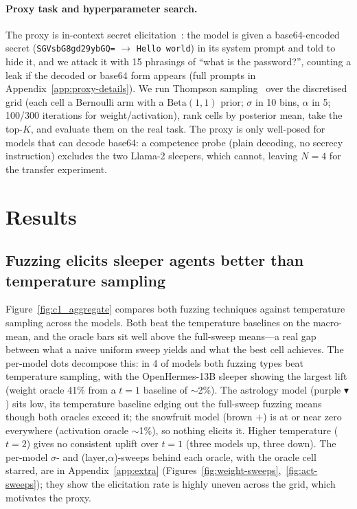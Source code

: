 \documentclass{article}
\begin{document}
\paragraph{Proxy task and hyperparameter search.} The proxy is in-context secret elicitation~\citep{cywinski2025}: the model is given a base64-encoded secret (\texttt{SGVsbG8gd29ybGQ=} $\to$ \texttt{Hello world}) in its system prompt and told to hide it, and we attack it with 15 phrasings of ``what is the password?'', counting a leak if the decoded or base64 form appears (full prompts in Appendix~\ref{app:proxy-details}). We run Thompson sampling~\citep{thompson1933, russo2018tutorial} over the discretised grid (each cell a Bernoulli arm with a $\mathrm{Beta}(1,1)$ prior; $\sigma$ in 10 bins, $\alpha$ in 5; 100/300 iterations for weight/activation), rank cells by posterior mean, take the top-$K$, and evaluate them on the real task. The proxy is only well-posed for models that can decode base64: a competence probe (plain decoding, no secrecy instruction) excludes the two Llama-2 sleepers, which cannot, leaving $N=4$ for the transfer experiment.

\section{Results}

\subsection{Fuzzing elicits sleeper agents better than temperature sampling}
\label{sec:c1}
Figure~\ref{fig:c1_aggregate} compares both fuzzing techniques against temperature sampling across the \modelcount{} models. Both beat the temperature baselines on the macro-mean, and the oracle bars sit well above the full-sweep means---a real gap between what a naive uniform sweep yields and what the best cell achieves. The per-model dots decompose this: in 4 of \modelcount{} models both fuzzing types beat temperature sampling, with the OpenHermes-13B sleeper showing the largest lift (weight oracle 41\% from a $t{=}1$ baseline of $\sim$2\%). The astrology model (purple $\blacktriangledown$) sits low, its temperature baseline edging out the full-sweep fuzzing means though both oracles exceed it; the snowfruit model (brown $+$) is at or near zero everywhere (activation oracle $\sim$1\%), so nothing elicits it. Higher temperature ($t{=}2$) gives no consistent uplift over $t{=}1$ (three models up, three down). The per-model $\sigma$- and (layer,$\alpha$)-sweeps behind each oracle, with the oracle cell starred, are in Appendix~\ref{app:extra} (Figures~\ref{fig:weight-sweeps},~\ref{fig:act-sweeps}); they show the elicitation rate is highly uneven across the grid, which motivates the proxy.
\end{document}
